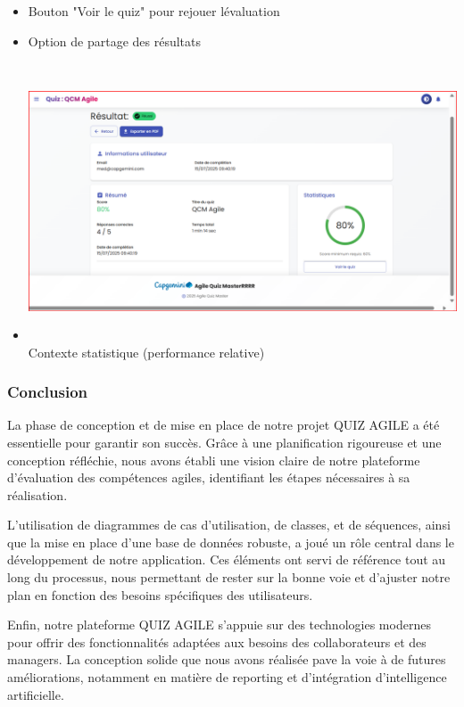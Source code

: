 \documentclass[12pt,a4paper,twoside]{report}
\begin{document}
\begin{enumerate}
  \begin{itemize}
  \item
    Bouton "Voir le quiz" pour rejouer l\textquotesingle évaluation
  \item
    Option de partage des résultats
  \item
    \includegraphics[width=6.3in,height=3.23681in]{latex_media/media/image65.png}Contexte
    statistique (performance relative)
  \end{itemize}
\end{enumerate}

\hypertarget{conclusion-4}{%
\subsubsection{Conclusion}\label{conclusion-4}}

La phase de conception et de mise en place de notre projet QUIZ AGILE a
été essentielle pour garantir son succès. Grâce à une planification
rigoureuse et une conception réfléchie, nous avons établi une vision
claire de notre plateforme d'évaluation des compétences agiles,
identifiant les étapes nécessaires à sa réalisation.

L'utilisation de diagrammes de cas d'utilisation, de classes, et de
séquences, ainsi que la mise en place d'une base de données robuste, a
joué un rôle central dans le développement de notre application. Ces
éléments ont servi de référence tout au long du processus, nous
permettant de rester sur la bonne voie et d'ajuster notre plan en
fonction des besoins spécifiques des utilisateurs.

Enfin, notre plateforme QUIZ AGILE s'appuie sur des technologies
modernes pour offrir des fonctionnalités adaptées aux besoins des
collaborateurs et des managers. La conception solide que nous avons
réalisée pave la voie à de futures améliorations, notamment en matière
de reporting et d'intégration d'intelligence artificielle.
\end{document}
